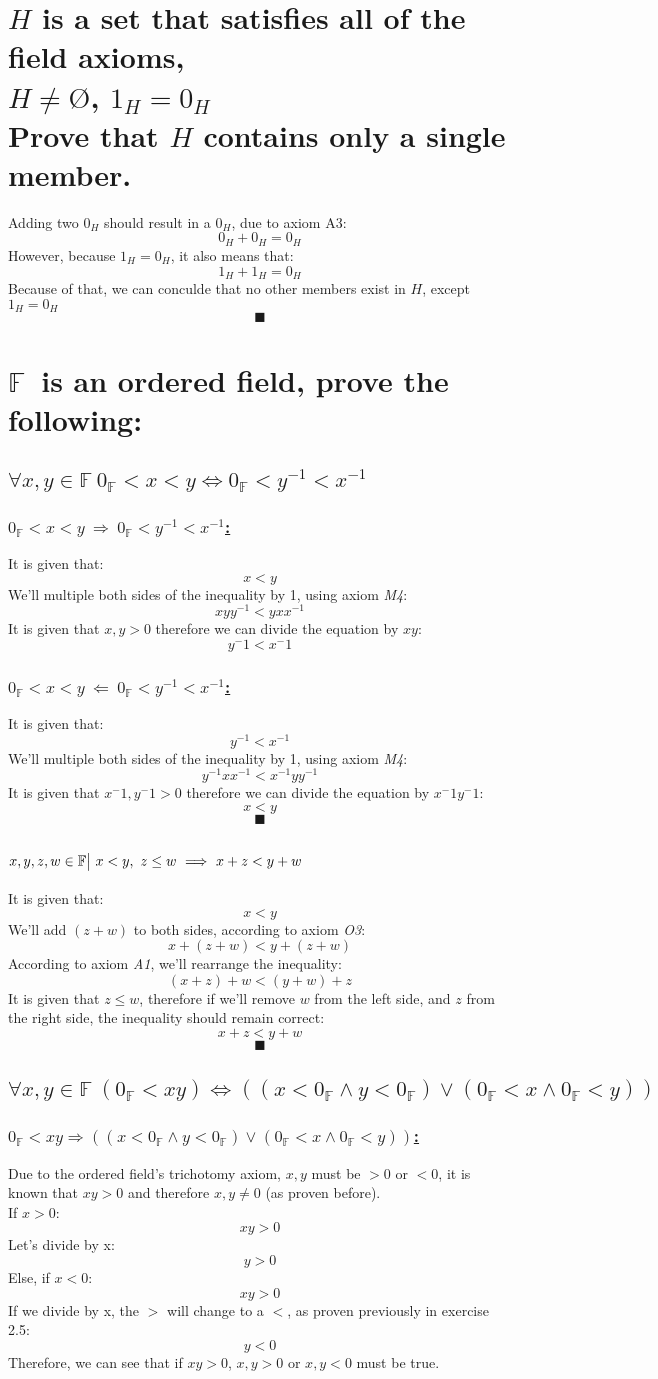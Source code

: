 \documentclass[a4paper, 12pt]{article}
\newcommand{\sub}[1]{\subsection{\underline{#1}}}
\newcommand{\subsub}[1]{\subsubsection{\underline{#1}}}
\newcommand{\?}{\stackrel{?}{=}}
\newcommand{\F}{\ensuremath{\mathbb{F}}}
\renewcommand{\qed}{$$\blacksquare$$}
\begin{document}
\section{$H$ is a set that satisfies all of the field axioms,\\
$H \neq \text{\O}$, $1_H=0_H$\\
Prove that $H$ contains only a single member.}
Adding two $0_H$ should result in a $0_H$, due to axiom A3: $$ 0_H + 0_H = 0_H $$
However, because $1_H=0_H$, it also means that: $$ 1_H + 1_H = 0_H $$
Because of that, we can conculde that no other members exist in $H$, except $1_H=0_H$
\qed

\section{\F~is an ordered field, prove the following:}

\sub{$\forall{x,y} \in{\F}~ 0_{\F}<x<y \iff 0_{\F}<y^{-1}<x^{-1} $}
\subsub{$0_{\F}<x<y ~\Longrightarrow~ 0_{\F}<y^{-1}<x^{-1} $:}
It is given that: $$ x<y $$
We'll multiple both sides of the inequality by 1, using axiom \textit{M4}: $$ xyy^{-1}<yxx^{-1} $$
It is given that $x,y > 0$ therefore we can divide the equation by $xy$: $$ y^-1 < x^-1 $$
\subsub{$0_{\F}<x<y ~\Longleftarrow~ 0_{\F}<y^{-1}<x^{-1} $:}
It is given that: $$ y^{-1}<x^{-1} $$
We'll multiple both sides of the inequality by 1, using axiom \textit{M4}: $$ y^{-1}xx^{-1}<x^{-1}yy^{-1} $$
It is given that $x^-1,y^-1 > 0$ therefore we can divide the equation by $x^-1y^-1$: $$ x<y $$
\qed\pagebreak

\sub{$ x,y,z,w \in \F \big{|}~ x<y,~z\leq{w} ~\Longrightarrow~ x+z<y+w$}
It is given that: $$ x<y $$
We'll add $(z+w)$ to both sides, according to axiom \textit{O3}: $$ x+(z+w) < y+(z+w) $$
According to axiom \textit{A1}, we'll rearrange the inequality: $$ (x+z)+w < (y+w)+z $$
It is given that $z \leq w$, therefore if we'll remove $w$ from the left side,
and $z$ from the right side, the inequality should remain correct:
$$ x+z < y+w $$
\qed\pagebreak

\sub{$ \forall{x,y} \in{\F}~ (0_{\F}<xy) \iff ((x<0_{\F} \land y<0_{\F}) \lor (0_{\F} < x \land 0_{\F}<y))  $}
\subsub{$ 0_{\F}<xy \Longrightarrow ((x<0_{\F} \land y<0_{\F}) \lor (0_{\F} < x \land 0_{\F}<y))$:}
Due to the ordered field's trichotomy axiom, $x,y$ must be $>0$ or $<0$, 
it is known that $xy>0$ and therefore $x,y \neq 0$ (as proven before).\\
If $x>0$: $$ xy > 0 $$
Let's divide by x: $$ y > 0 $$
Else, if $x<0$: $$ xy > 0 $$
If we divide by x, the $>$ will change to a $<$, as proven previously in exercise 2.5: $$ y < 0 $$
Therefore, we can see that if $xy>0$, $x,y>0$ or $x,y<0$ must be true.
\end{document}
